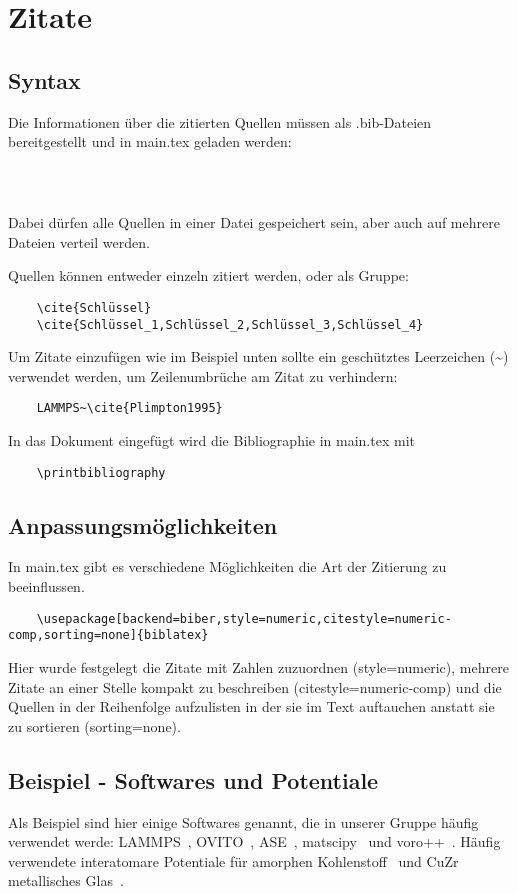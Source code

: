 \chapter{Zitate}

\section{Syntax}
Die Informationen über die zitierten Quellen müssen als \textasteriskcentered .bib-Dateien bereitgestellt und in \glqq{} main.tex\grqq{} geladen werden:
\begin{verbatim}
	
	
\end{verbatim}
Dabei dürfen alle Quellen in einer Datei gespeichert sein, aber auch auf mehrere Dateien verteil werden.

Quellen können entweder einzeln zitiert werden, oder als Gruppe:
\begin{verbatim}
	\cite{Schlüssel}
	\cite{Schlüssel_1,Schlüssel_2,Schlüssel_3,Schlüssel_4}
\end{verbatim}

Um Zitate einzufügen wie im Beispiel unten sollte ein geschütztes Leerzeichen (\textasciitilde) verwendet werden, um Zeilenumbrüche am Zitat zu verhindern:
\begin{verbatim}
	LAMMPS~\cite{Plimpton1995}
\end{verbatim}

In das Dokument eingefügt wird die Bibliographie in \glqq{} main.tex\grqq{} mit
\begin{verbatim}
	\printbibliography
\end{verbatim}

\section{Anpassungsmöglichkeiten}
In \glqq{} main.tex\grqq{} gibt es verschiedene Möglichkeiten die Art der Zitierung zu beeinflussen.
\begin{verbatim}
	\usepackage[backend=biber,style=numeric,citestyle=numeric-comp,sorting=none]{biblatex}
\end{verbatim}
Hier wurde festgelegt die Zitate mit Zahlen zuzuordnen (\glqq{}style=numeric\grqq{}), mehrere Zitate an einer Stelle kompakt zu beschreiben (\glqq{}citestyle=numeric-comp\grqq{}) und die Quellen in der Reihenfolge aufzulisten in der sie im Text auftauchen anstatt sie zu sortieren (\glqq{}sorting=none\grqq{}).

\section{Beispiel - Softwares und Potentiale}
Als Beispiel sind hier einige Softwares genannt, die in unserer Gruppe häufig verwendet werde: LAMMPS~\cite{Plimpton1995}, OVITO~\cite{Stukowski2010}, ASE~\cite{HjorthLarsen2017}, matscipy~\cite{matscipy} und voro++~\cite{Rycroft2009}.
Häufig verwendete interatomare Potentiale für amorphen Kohlenstoff~\cite{Deringer2016,Pastewka:2013p205410,Liyanage2014} und CuZr metallisches Glas~\cite{Mendelev2009,Cheng2009}.